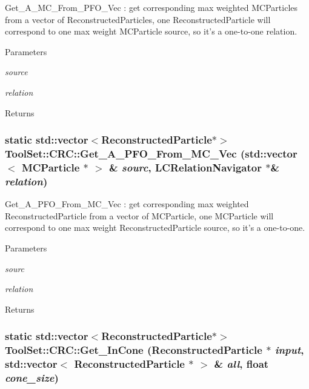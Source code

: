 Get\_\-A\_\-MC\_\-From\_\-PFO\_\-Vec : get corresponding max weighted MCParticles from a vector of ReconstructedParticles, one ReconstructedParticle will correspond to one max weight MCParticle source, so it's a one-\/to-\/one relation. 
\begin{DoxyParams}{Parameters}
\item[{\em source}]\item[{\em relation}]\end{DoxyParams}
\begin{DoxyReturn}{Returns}

\end{DoxyReturn}
\hypertarget{classToolSet_1_1CRC_a0b26baca07714b53f86982be73121faa}{
\subsubsection[{Get\_\-A\_\-PFO\_\-From\_\-MC\_\-Vec}]{\setlength{\rightskip}{0pt plus 5cm}static std::vector$<$ReconstructedParticle$\ast$$>$ ToolSet::CRC::Get\_\-A\_\-PFO\_\-From\_\-MC\_\-Vec (std::vector$<$ MCParticle $\ast$ $>$ \& {\em sourc}, \/  LCRelationNavigator $\ast$\& {\em relation})}}
\label{classToolSet_1_1CRC_a0b26baca07714b53f86982be73121faa}


Get\_\-A\_\-PFO\_\-From\_\-MC\_\-Vec : get corresponding max weighted ReconstructedParticle from a vector of MCParticle, one MCParticle will correspond to one max weight ReconstructedParticle source, so it's a one-\/to-\/one. 
\begin{DoxyParams}{Parameters}
\item[{\em sourc}]\item[{\em relation}]\end{DoxyParams}
\begin{DoxyReturn}{Returns}

\end{DoxyReturn}
\hypertarget{classToolSet_1_1CRC_a336841f7c8474540deb1cd1f119f5cf2}{
\subsubsection[{Get\_\-InCone}]{\setlength{\rightskip}{0pt plus 5cm}static std::vector$<$ReconstructedParticle$\ast$$>$ ToolSet::CRC::Get\_\-InCone (ReconstructedParticle $\ast$ {\em input}, \/  std::vector$<$ ReconstructedParticle $\ast$ $>$ \& {\em all}, \/  float {\em cone\_\-size})}}
\label{classToolSet_1_1CRC_a336841f7c8474540deb1cd1f119f5cf2}


